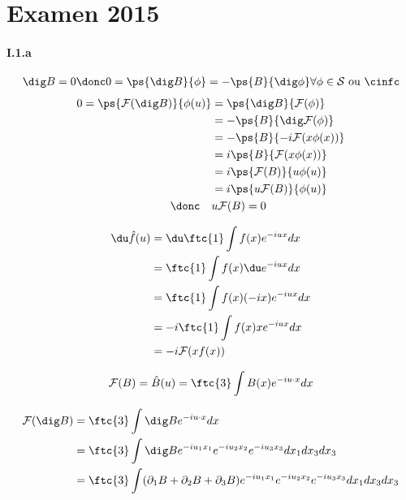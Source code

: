 \section{Examen 2015}

\paragraph{I.1.a}

\begin{align}
    \dig B = 0 \donc 0 = \ps{\dig B}{\phi} = -\ps{B}{\dig \phi}
    \forall \phi \in \mathcal{S} \text{ ou } \cinfc
\end{align}
%
\begin{align}
    0 = \ps{\mathcal{F}(\dig B)}{\phi(u)} &= \ps{\dig B}{\mathcal{F}(\phi)} \\
    &= -\ps{B}{\dig \mathcal{F}(\phi)} \\
    &= -\ps{B}{-i \mathcal{F} (x\phi(x))} \\
    &= i \ps{B}{\mathcal{F} (x\phi(x))} \\
    &= i \ps{\mathcal{F}(B)}{u \phi(u)} \\
    &= i \ps{u \mathcal{F}(B)}{\phi(u)} \\
    \donc \quad & u \mathcal{F}(B) = 0
\end{align}

\begin{align}
    \du \hat f(u) &= \du \ftc{1} \int f(x) e^{-iux} dx \\
    &= \ftc{1} \int f(x) \du e^{-iux} dx \\
    &= \ftc{1} \int f(x) (-ix) e^{-iux} dx \\
    &= -i \ftc{1} \int f(x) x e^{-iux} dx \\
    &= -i \mathcal{F} (xf(x))
\end{align}






\begin{align}
    \mathcal{F}(B) =  \hat B(u) = \ftc{3} \int B(x) e^{-iu \cdot x} dx
\end{align}





\begin{align}
    \mathcal{F}(\dig B) &= \ftc{3} \int \dig B e^{-iu \cdot x} dx \\
    &= \ftc{3} \int \dig B e^{-i u_1 x_1} e^{-i u_2 x_2} e^{-i u_3 x_3} dx_1 dx_3 dx_3 \\
    &= \ftc{3} \int (\partial_1 B + \partial_2 B + \partial_3 B)  e^{-i u_1 x_1} e^{-i u_2 x_2} e^{-i u_3 x_3} dx_1 dx_3 dx_3 \\
\end{align}





